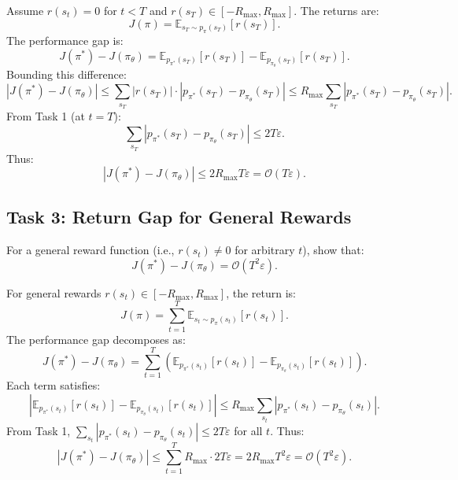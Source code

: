 \documentclass[12pt]{article}
\begin{document}
{{Assume $r(s_t) = 0$ for $t < T$ and $r(s_T) \in [-R_{\max}, R_{\max}]$. The returns are:  
\[
J(\pi) = \mathbb{E}_{s_T \sim p_\pi(s_T)} \left[ r(s_T) \right].
\]
The performance gap is:  
\[
J(\pi^*) - J(\pi_\theta) = \mathbb{E}_{p_{\pi^*}(s_T)} \left[ r(s_T) \right] - \mathbb{E}_{p_{\pi_\theta}(s_T)} \left[ r(s_T) \right].
\]
Bounding this difference:  
\[
\left| J(\pi^*) - J(\pi_\theta) \right| \leq \sum_{s_T} \left| r(s_T) \right| \cdot \left| p_{\pi^*}(s_T) - p_{\pi_\theta}(s_T) \right| \leq R_{\max} \sum_{s_T} \left| p_{\pi^*}(s_T) - p_{\pi_\theta}(s_T) \right|.
\]
From Task 1 (at $t = T$):  
\[
\sum_{s_T} \left| p_{\pi^*}(s_T) - p_{\pi_\theta}(s_T) \right| \leq 2T\varepsilon.
\]
Thus:  
\[
\left| J(\pi^*) - J(\pi_\theta) \right| \leq 2 R_{\max} T \varepsilon = \mathcal{O}(T \varepsilon).
\]

\subsection{Task 3: Return Gap for General Rewards}
For a general reward function (i.e., \( r(s_t) \ne 0 \) for arbitrary \( t \)), show that:
\[
J(\pi^*) - J(\pi_\theta) = \mathcal{O}(T^2 \varepsilon).
\]
			

For general rewards $r(s_t) \in [-R_{\max}, R_{\max}]$, the return is:  
\[
J(\pi) = \sum_{t=1}^{T} \mathbb{E}_{s_t \sim p_\pi(s_t)} \left[ r(s_t) \right].
\]
The performance gap decomposes as:  
\[
J(\pi^*) - J(\pi_\theta) = \sum_{t=1}^{T} \left( \mathbb{E}_{p_{\pi^*}(s_t)} \left[ r(s_t) \right] - \mathbb{E}_{p_{\pi_\theta}(s_t)} \left[ r(s_t) \right] \right).
\]
Each term satisfies:  
\[
\left| \mathbb{E}_{p_{\pi^*}(s_t)} \left[ r(s_t) \right] - \mathbb{E}_{p_{\pi_\theta}(s_t)} \left[ r(s_t) \right] \right| \leq R_{\max} \sum_{s_t} \left| p_{\pi^*}(s_t) - p_{\pi_\theta}(s_t) \right|.
\]
From Task 1, $\sum_{s_t} \left| p_{\pi^*}(s_t) - p_{\pi_\theta}(s_t) \right| \leq 2T\varepsilon$ for all $t$. Thus:  
\[
\left| J(\pi^*) - J(\pi_\theta) \right| \leq \sum_{t=1}^{T} R_{\max} \cdot 2T\varepsilon = 2 R_{\max} T^2 \varepsilon = \mathcal{O}(T^2 \varepsilon).
\]
			
	}}
	
	
	
			
			
\end{document}
